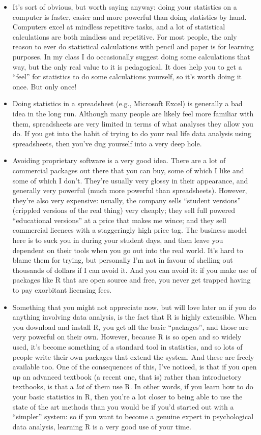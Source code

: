 \documentclass[
]{book}
\providecommand{\tightlist}{%
  \setlength{\itemsep}{0pt}\setlength{\parskip}{0pt}}
\begin{document}
\begin{itemize}
\tightlist
\item
  It's sort of obvious, but worth saying anyway: doing your statistics on a computer is faster, easier and more powerful than doing statistics by hand. Computers excel at mindless repetitive tasks, and a lot of statistical calculations are both mindless and repetitive. For most people, the only reason to ever do statistical calculations with pencil and paper is for learning purposes. In my class I do occasionally suggest doing some calculations that way, but the only real value to it is pedagogical. It does help you to get a ``feel'' for statistics to do some calculations yourself, so it's worth doing it once. But only once!
\item
  Doing statistics in a spreadsheet (e.g., Microsoft Excel) is generally a bad idea in the long run. Although many people are likely feel more familiar with them, spreadsheets are very limited in terms of what analyses they allow you do. If you get into the habit of trying to do your real life data analysis using spreadsheets, then you've dug yourself into a very deep hole.
\item
  Avoiding proprietary software is a very good idea. There are a lot of commercial packages out there that you can buy, some of which I like and some of which I don't. They're usually very glossy in their appearance, and generally very powerful (much more powerful than spreadsheets). However, they're also very expensive: usually, the company sells ``student versions'' (crippled versions of the real thing) very cheaply; they sell full powered ``educational versions'' at a price that makes me wince; and they sell commercial licences with a staggeringly high price tag. The business model here is to suck you in during your student days, and then leave you dependent on their tools when you go out into the real world. It's hard to blame them for trying, but personally I'm not in favour of shelling out thousands of dollars if I can avoid it. And you can avoid it: if you make use of packages like R that are open source and free, you never get trapped having to pay exorbitant licensing fees.
\item
  Something that you might not appreciate now, but will love later on if you do anything involving data analysis, is the fact that R is highly extensible. When you download and install R, you get all the basic ``packages'', and those are very powerful on their own. However, because R is so open and so widely used, it's become something of a standard tool in statistics, and so lots of people write their own packages that extend the system. And these are freely available too. One of the consequences of this, I've noticed, is that if you open up an advanced textbook (a recent one, that is) rather than introductory textbooks, is that a \emph{lot} of them use R. In other words, if you learn how to do your basic statistics in R, then you're a lot closer to being able to use the state of the art methods than you would be if you'd started out with a ``simpler'' system: so if you want to become a genuine expert in psychological data analysis, learning R is a very good use of your time.

\end{itemize}
\end{document}
